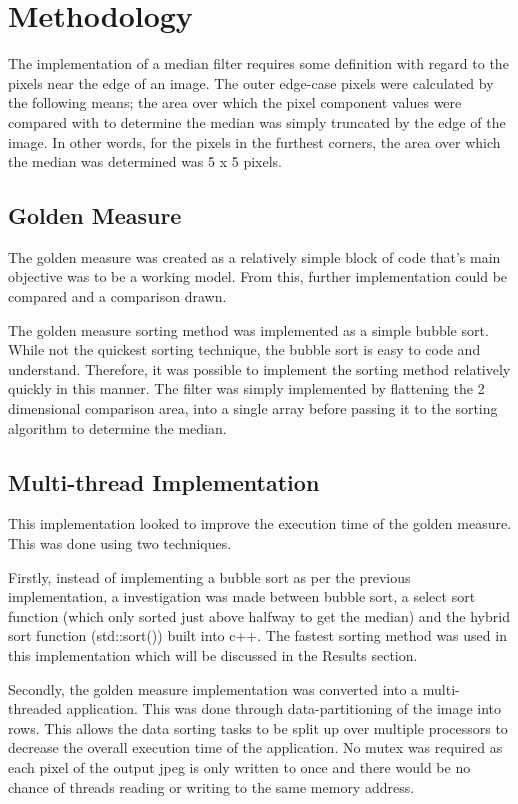 \section{Methodology}
The implementation of a median filter requires some definition with regard to the pixels near the edge of an image. The outer edge-case pixels were calculated by the following means; the area over which the pixel component values were compared with to determine the median was simply truncated by the edge of the image. In other words, for the pixels in the furthest corners, the area over which the median was determined was 5 x 5 pixels.

\subsection{Golden Measure}
The golden measure was created as a relatively simple block of code that's main objective was to be a working model. From this, further implementation could be compared and a comparison drawn.

The golden measure sorting method was implemented as a simple bubble sort. While not the quickest sorting technique, the bubble sort is easy to code and understand. Therefore, it was possible to implement the sorting method relatively quickly in this manner. The filter was simply implemented by flattening the 2 dimensional comparison area, into a single array before passing it to the sorting algorithm to determine the median.

\subsection{Multi-thread Implementation}
This implementation looked to improve the execution time of the golden measure. This was done using two techniques. 

Firstly, instead of implementing a bubble sort as per the previous implementation, a investigation was made between bubble sort, a select sort function (which only sorted just above halfway to get the median) and the hybrid sort function (std::sort()) built into c++. The fastest sorting method was used in this implementation which will be discussed in the Results section.

Secondly, the golden measure implementation was converted into a multi-threaded application. This was done through data-partitioning of the image into rows. This allows the data sorting tasks to be split up over multiple processors to decrease the overall execution time of the application. No mutex was required as each pixel of the output jpeg is only written to once and there would be no chance of threads reading or writing to the same memory address.
  
